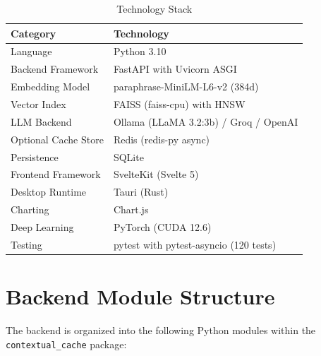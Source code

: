 \documentclass[12pt,a4paper]{report}
\begin{document}
\begin{table}[H]
\centering
\begin{tabular}{ll}
\toprule
\textbf{Category} & \textbf{Technology} \\
\midrule
Language & Python 3.10 \\
Backend Framework & FastAPI with Uvicorn ASGI \\
Embedding Model & paraphrase-MiniLM-L6-v2 (384d) \\
Vector Index & FAISS (faiss-cpu) with HNSW \\
LLM Backend & Ollama (LLaMA 3.2:3b) / Groq / OpenAI \\
Optional Cache Store & Redis (redis-py async) \\
Persistence & SQLite \\
Frontend Framework & SvelteKit (Svelte 5) \\
Desktop Runtime & Tauri (Rust) \\
Charting & Chart.js \\
Deep Learning & PyTorch (CUDA 12.6) \\
Testing & pytest with pytest-asyncio (120 tests) \\
\bottomrule
\end{tabular}
\caption{Technology Stack}
\label{tab:techstack}
\end{table}

\section{Backend Module Structure}

The backend is organized into the following Python modules within the \texttt{contextual\_cache} package:
\end{document}
